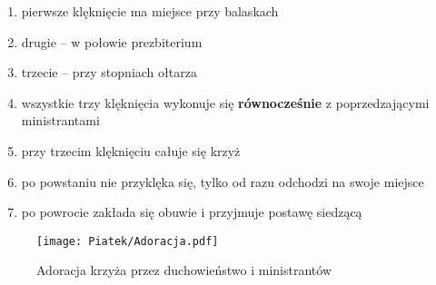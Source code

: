 \begin{itemize}
            \begin{enumerate}[leftmargin=1cm]
                  \item pierwsze klęknięcie ma miejsce przy balaskach
                  \item drugie -- w połowie prezbiterium
                  \item trzecie -- przy stopniach ołtarza
                  \item wszystkie trzy klęknięcia wykonuje się
                        \textbf{równocześnie} z poprzedzającymi ministrantami
                  \item przy trzecim klęknięciu całuje się krzyż
                  \item po powstaniu nie przyklęka się, tylko od razu odchodzi
                        na swoje miejsce
                  \item po powrocie zakłada się obuwie i przyjmuje postawę
                        siedzącą
            \end{enumerate}

            \begin{figure}[h]
                  \centering
                  \texttt{[image: Piatek/Adoracja.pdf]}
                  \caption{Adoracja krzyża przez duchowieństwo i ministrantów}
                  \label{fig:adoracja}
            \end{figure}


\end{itemize}
